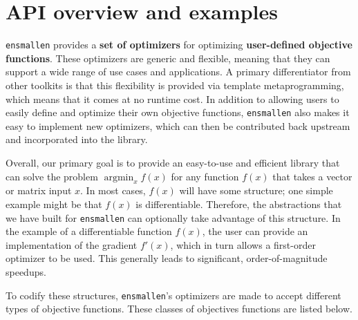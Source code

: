 \section{API overview and examples}
\label{sec:api}

{\tt ensmallen} provides a {\bf set of optimizers} for optimizing {\bf
user-defined objective functions}.  These optimizers are generic and flexible,
meaning that they can support a wide range of use cases and applications.  A
primary differentiator from other toolkits is that this flexibility is provided
via template metaprogramming, which means that it comes at no runtime cost.
In addition to allowing users to easily define and optimize their own objective
functions, {\tt ensmallen} also makes it easy to implement new optimizers, which
can then be contributed back upstream and incorporated into the library.

Overall, our primary goal is to provide an easy-to-use and efficient library
that can solve the problem $\operatorname{argmin}_x f(x)$ for any function
$f(x)$ that takes a vector or matrix input $x$.  In most cases, $f(x)$ will have
some structure; one simple example might be that $f(x)$ is differentiable.
Therefore, the abstractions that we have built for {\tt ensmallen} can
optionally take advantage of this structure.  In the example of a differentiable
function $f(x)$, the user can provide an implementation of the gradient $f'(x)$,
which in turn allows a first-order optimizer to be used.  This generally leads
to significant, order-of-magnitude speedups.

To codify these structures, {\tt ensmallen}'s optimizers are made to accept
different types of objective functions.  These classes of objectives functions
are listed below.

